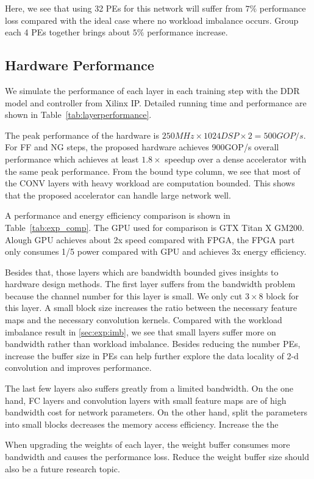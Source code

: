 Here, we see that using 32 PEs for this network will suffer from $7\%$ performance loss compared with the ideal case where no workload imbalance occurs. Group each 4 PEs together brings about $5\%$ performance increase. %


\subsection{Hardware Performance}
We simulate the performance of each layer in each training step with the DDR model and controller from Xilinx IP. Detailed running time and performance are shown in Table~\ref{tab:layerperformance}.





The peak performance of the hardware is $250MHz \times 1024DSP \times 2 = 500GOP/s$. For FF and NG steps, the proposed hardware achieves 900GOP/s overall performance which achieves at least $1.8\times$ speedup over a dense accelerator with the same peak performance. From the bound type column, we see that most of the CONV layers with heavy workload are computation bounded. This shows that the proposed accelerator can handle large network well.

A performance and energy efficiency comparison is shown in Table~\ref{tab:exp_comp}. The GPU used for comparison is GTX Titan X GM200. Alough GPU achieves about 2x speed compared with FPGA, the FPGA part only consumes 1/5 power compared with GPU and achieves 3x energy efficiency.

Besides that, those layers which are bandwidth bounded gives insights to hardware design methods. The first layer suffers from the bandwidth problem because the channel number for this layer is small. We only cut $3\times 8$ block for this layer. A small block size increases the ratio between the necessary feature maps and the necessary convolution kernels. Compared with the workload imbalance result in \ref{sec:exp:imb}, we see that small layers suffer more on bandwidth rather than workload imbalance. Besides reducing the number PEs, increase the buffer size in PEs can help further explore the data locality of 2-d convolution and improves performance. 

The last few layers also suffers greatly from a limited bandwidth. On the one hand, FC layers and convolution layers with small feature maps are of high bandwidth cost for network parameters. On the other hand, split the parameters into small blocks decreases the memory access efficiency. Increase the the 

When upgrading the weights of each layer, the weight buffer consumes more bandwidth and causes the performance loss. Reduce the weight buffer size should also be a future research topic. 





